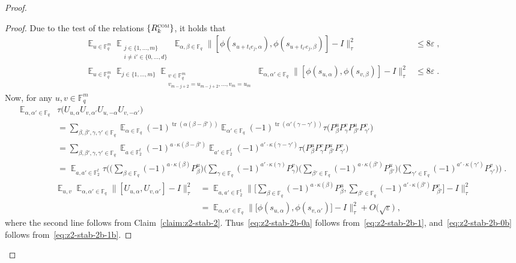 \documentclass[11pt]{article}
\theoremstyle{definition}
\newcommand{\Id}{\ensuremath{I}}
\DeclareMathOperator*{\Expectation}{\mathbb{E}}
\newcommand{\Es}[1]{\Expectation_{#1}}
\newcommand{\F}{\ensuremath{\mathbb{F}}}
\newcommand{\com}{\textsc{com}}
\newcommand{\eps}{\varepsilon}
\DeclareMathOperator{\tr}{tr}
\begin{document}
\begin{proof}
\begin{proof}
Due to the test of the relations $\{R^\com_k\}$, it holds that 
\begin{align}
\Es{u\in \F_q^m} \Es{\substack{j\in\{1,\ldots,m\} \\ i\neq i' \in \{0,\ldots,d\}}} \Es{\alpha,\beta\in \F_q} \big\| [\phi(s_{u+t_i e_j,\alpha}),\phi(s_{u+t_{i'} e_j,\beta})] - \Id \big\|_\tau^2&\leq 8\eps\; ,\label{eq:z2-stab-2b-1}\\
\Es{u\in \F_q^m} \Es{j\in\{1,\ldots,m\}} \Es{\substack{v\in \F_q^m \\v_{m-j+2}=u_{m-j+2},\ldots,v_m=u_m}}\Es{\alpha,\alpha'\in \F_q} \big\| [\phi(s_{u,\alpha}),\phi(s_{v,\beta})]-\Id\big\|_\tau^2&\leq 8\eps\;.\label{eq:z2-stab-2b-1b}
\end{align}
Now, for any $u,v\in \F_q^m$
\begin{align*}
\Es{\alpha,\alpha'\in \F_q} &\tau\big( U_{u,\alpha} U_{v,\alpha'} U_{u,-\alpha} U_{v,-\alpha'} \big) \\
&= \sum_{\beta,\beta',\gamma,\gamma'\in \F_q}\Es{\alpha\in \F_q} (-1)^{\tr(\alpha(\beta-\beta'))} \Es{\alpha'\in \F_q} (-1)^{\tr(\alpha'(\gamma-\gamma'))}  \tau(P^{u}_\beta P^{v}_\gamma P^{u}_{\beta'} P^{v}_{\gamma'}\big)\\
&=\sum_{\beta,\beta',\gamma,\gamma'\in \F_q}\Es{a\in\F_2^t} (-1)^{a\cdot\kappa(\beta-\beta')} \Es{a'\in\F_2^t} (-1)^{a'\cdot\kappa(\gamma-\gamma')} \tau(P^{u}_\beta P^{v}_\gamma P^{u}_{\beta'} P^{v}_{\gamma'}\big)\\
&=\Es{a,a'\in\F_2^t}  \tau\Big( \Big(\sum_{\beta\in \F_q} (-1)^{a\cdot \kappa(\beta)} P^{u}_\beta\Big) \Big(\sum_{\gamma\in \F_q} (-1)^{a'\cdot \kappa(\gamma)} P^{v}_\gamma\Big)\Big(\sum_{\beta'\in \F_q} (-1)^{a\cdot \kappa(\beta')} P^{u}_{\beta'}\Big)\Big(\sum_{\gamma'\in \F_q} (-1)^{a'\cdot \kappa(\gamma')} P^{v}_{\gamma'}\Big)\Big)\;.
\end{align*}
\begin{align*}
\Es{u,v} \Es{\alpha,\alpha'\in \F_q} \big\| [U_{u,\alpha} ,U_{v,\alpha'} ]-\Id\big\|_\tau^2
&= \Es{a,a'\in \F_2^t} \Big\| \Big[\sum_{\beta\in \F_q} (-1)^{a\cdot \kappa(\beta)} P^{u}_\beta ,\sum_{\beta'\in \F_q} (-1)^{a'\cdot \kappa(\beta')} P^{v}_{\beta'} \Big]-\Id\Big\|_\tau^2\\
&= \Es{\alpha,\alpha'\in \F_q} \big\| \big[ \phi(s_{u,\alpha}),\phi(s_{v,\alpha'})\big]-\Id\big\|_\tau^2+O\big(\sqrt{\eps}\big)\;,
\end{align*}
where the second line follows from Claim~\ref{claim:z2-stab-2}. Thus~\eqref{eq:z2-stab-2b-0a} follows from~\eqref{eq:z2-stab-2b-1}, and~\eqref{eq:z2-stab-2b-0b} follows from~\eqref{eq:z2-stab-2b-1b}.
\end{proof}


\end{proof}
\end{document}
